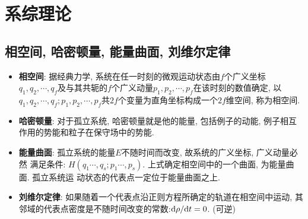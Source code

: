 \section{系综理论}

\subsection{相空间, 哈密顿量, 能量曲面, 刘维尔定律}
\begin{itemize}
\item\textbf{相空间}: 据经典力学, 系统在任一时刻的微观运动状态由$f$个广义坐标$q_1,q_2,\cdots,q_f
$及与其共轭的$f$个广义动量$p_1, p_2,\cdots, p_f$在该时刻的数值确定, 以$q_1,q_2,\cdots, q_f; p_1, p_2,\cdots, p_f$共$2f$个变量为直角坐标构成一个$2f$维空间, 称为相空间.
\item\textbf{哈密顿量}: 对于孤立系统, 哈密顿量就是他的能量, 包括例子的动能, 例子相互作用的势能和粒子在保守场中的势能.
\item\textbf{能量曲面}: 孤立系统的能量$E$不随时间而改变, 故系统的广义坐标, 广义动量必然
满足条件: $H(q_1\cdots,q_s; p_1\cdots,p_s)$. 上式确定相空间中的一个曲面, 为能量曲面. 孤立系统运
动状态的代表点一定位于能量曲面之上.
\item\textbf{刘维尔定律}: 如果随着一个代表点沿正则方程所确定的轨道在相空间中运动, 其邻域的代表点密度是不随时间改变的常数:$\mathrm{d} \rho/\mathrm{d} t = 0$. (可逆)
\end{itemize}


